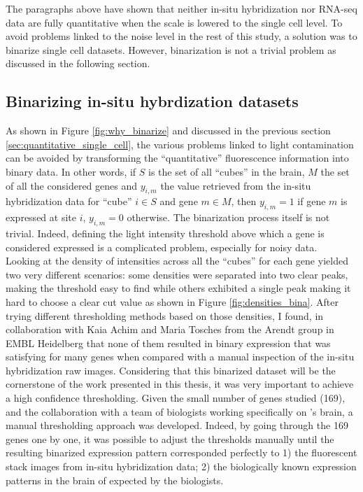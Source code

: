 	The paragraphs above have shown that neither in-situ hybridization nor RNA-seq data are fully quantitative when the scale is lowered to the single cell level. To avoid problems linked to the noise level in the rest of this study, a solution was to binarize single cell datasets. However, binarization is not a trivial problem as discussed in the following section.
	
	
  \subsection{Binarizing in-situ hybrdization datasets}
	As shown in Figure \ref{fig:why_binarize} and discussed in the previous section \ref{sec:quantitative_single_cell}, the various problems linked to light contamination can be avoided by transforming the ``quantitative'' fluorescence information into binary data. In other words, if $S$ is the set of all ``cubes'' in the brain, $M$ the set of all the considered genes and $y_{i,m}$ the value retrieved from the in-situ hybridization data for ``cube'' $i \in S$ and gene $m \in M$, then  $y_{i,m} = 1$ if gene $m$ is expressed at site $i$, $y_{i,m} = 0$ otherwise. The binarization process itself is not trivial. Indeed, defining the light intensity threshold above which a gene is considered expressed is a complicated problem, especially for noisy data.\\

	Looking at the density of intensities across all the ``cubes'' for each gene yielded two very different scenarios: some densities were separated into two clear peaks, making the threshold easy to find while others exhibited a single peak making it hard to choose a clear cut value as shown in Figure \ref{fig:densities_bina}. After trying different thresholding methods based on those densities, I found, in collaboration with Kaia Achim and Maria Tosches from the Arendt group in EMBL Heidelberg that none of them resulted in binary expression that was satisfying for many genes when compared with a manual inspection of the in-situ hybridization raw images. Considering that this binarized dataset will be the cornerstone of the work presented in this thesis, it was very important to achieve a high confidence thresholding. Given the small number of genes studied (169), and the collaboration with a team of biologists working specifically on \platyfull{}'s brain, a manual thresholding approach was developed. Indeed, by going through the 169 genes one by one, it was possible to adjust the thresholds manually until the resulting binarized expression pattern corresponded perfectly to 1) the fluorescent stack images from in-situ hybridization data; 2) the biologically known expression patterns in the brain of \platy{} expected by the biologists.\\
	
